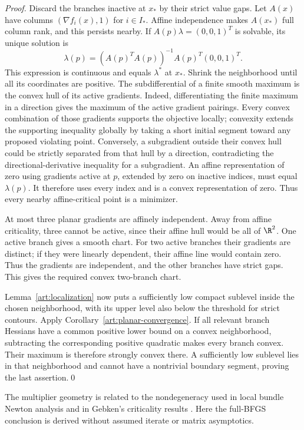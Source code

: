 \begin{proof}
Discard the branches inactive at $x_*$ by their strict value gaps. Let $A(x)$
have columns $(\nabla f_i(x),1)$ for $i\in I_*$. Affine independence makes
$A(x_*)$ full column rank, and this persists nearby. If
$A(p)\lambda=(0,0,1)^T$ is solvable, its unique solution is
\[
 \lambda(p)=(A(p)^TA(p))^{-1}A(p)^T(0,0,1)^T.
\]
This expression is continuous and equals $\lambda^*$ at $x_*$. Shrink the
neighborhood until all its coordinates are positive. The subdifferential
of a finite smooth maximum is the convex hull of its active gradients.
Indeed, differentiating the finite maximum in a direction gives the maximum
of the active gradient pairings. Every convex combination of those gradients
supports the objective locally; convexity extends the supporting inequality
globally by taking a short initial segment toward any proposed violating
point. Conversely, a subgradient outside their convex
hull could be strictly separated from that hull by a direction, contradicting
the directional-derivative inequality for a subgradient.
An affine representation of zero using gradients active at $p$, extended by
zero on inactive indices, must equal $\lambda(p)$. It therefore uses every
index and is a convex representation of zero. Thus every nearby
affine-critical point is a minimizer.

At most three planar gradients are affinely independent. Away from affine
criticality, three cannot be active, since their affine hull would be all of
$\R^2$. One active branch gives a smooth chart. For two active branches their
gradients are distinct; if they were linearly dependent, their affine line
would contain zero. Thus the gradients are independent, and the other
branches have strict gaps. This gives the required convex two-branch chart.

Lemma~\ref{art:localization} now puts a sufficiently low compact sublevel
inside the chosen neighborhood, with its upper level also below the threshold
for strict contours. Apply Corollary~\ref{art:planar-convergence}.
If all relevant branch Hessians have a common positive lower bound on a
convex neighborhood, subtracting the corresponding positive quadratic
makes every branch convex. Their maximum is therefore strongly convex
there. A sufficiently low sublevel lies in that neighborhood and cannot have
a nontrivial boundary segment, proving the last assertion.\qed
\end{proof}

The multiplier geometry is related to the nondegeneracy used in local bundle
Newton analysis  and in Gebken's
criticality results \cite{BG}.
Here the full-BFGS conclusion is derived without assumed iterate or matrix
asymptotics.


